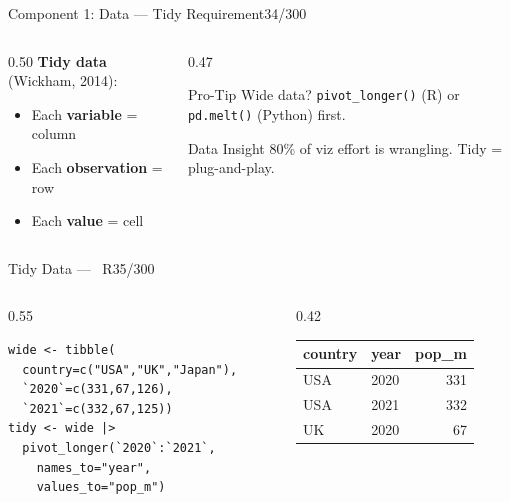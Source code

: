 \documentclass[10pt]{beamer}
\newcommand{\Rlang}{\textcolor{RAccent}{\faRProject~R}}
\newcommand{\smark}[1]{\hfill{\scriptsize\color{codegray}#1}}
\begin{document}
\begin{frame}{Component 1: Data --- Tidy Requirement}\smark{34/300}
\begin{columns}[T]
\begin{column}{0.50\textwidth}
\textbf{Tidy data} (Wickham, 2014):
\begin{itemize}
    \item Each \textbf{variable} = column
    \item Each \textbf{observation} = row
    \item Each \textbf{value} = cell
\end{itemize}
\end{column}
\begin{column}{0.47\textwidth}
\begin{alertblock}{Pro-Tip}
    \scriptsize Wide data? \texttt{pivot\_longer()} (R) or \texttt{pd.melt()} (Python) first.
\end{alertblock}
\begin{exampleblock}{Data Insight}
    \scriptsize 80\% of viz effort is wrangling. Tidy = plug-and-play.
\end{exampleblock}
\end{column}
\end{columns}
\end{frame}

\begin{frame}[fragile]{Tidy Data --- \Rlang}\smark{35/300}
\begin{columns}[T]
\begin{column}{0.55\textwidth}
\begin{lstlisting}[style=Rstyle]
wide <- tibble(
  country=c("USA","UK","Japan"),
  `2020`=c(331,67,126),
  `2021`=c(332,67,125))
tidy <- wide |>
  pivot_longer(`2020`:`2021`,
    names_to="year",
    values_to="pop_m")
\end{lstlisting}
\end{column}
\begin{column}{0.42\textwidth}\scriptsize
\begin{tabular}{@{}llr@{}}
    \toprule
    country & year & pop\_m \\
    \midrule
    USA & 2020 & 331 \\
    USA & 2021 & 332 \\
    UK  & 2020 &  67 \\
    \bottomrule
\end{tabular}
\end{column}
\end{columns}
\end{frame}
\end{document}
